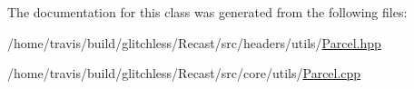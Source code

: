 The documentation for this class was generated from the following files\-:\begin{DoxyCompactItemize}
\item 
/home/travis/build/glitchless/\-Recast/src/headers/utils/\hyperlink{_parcel_8hpp}{Parcel.\-hpp}\item 
/home/travis/build/glitchless/\-Recast/src/core/utils/\hyperlink{_parcel_8cpp}{Parcel.\-cpp}\end{DoxyCompactItemize}
